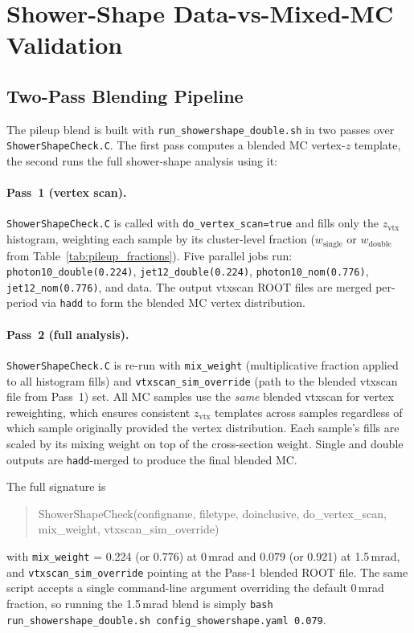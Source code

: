\documentclass[11pt,a4paper]{article}
\newcommand{\zvtx}{\ensuremath{z_{\mathrm{vtx}}}\xspace}
\begin{document}
\section{Shower-Shape Data-vs-Mixed-MC Validation}
\label{sec:shower_shape}

\subsection{Two-Pass Blending Pipeline}
\label{subsec:two_pass}

The pileup blend is built with \texttt{run\_showershape\_double.sh}
in two passes over \texttt{ShowerShapeCheck.C}. The first pass
computes a blended MC vertex-$z$ template, the second runs the full
shower-shape analysis using it:

\paragraph{Pass~1 (vertex scan).}
\texttt{ShowerShapeCheck.C} is called with
\texttt{do\_vertex\_scan=true} and fills only the \zvtx histogram,
weighting each sample by its cluster-level fraction
($w_{\text{single}}$ or $w_{\text{double}}$ from
Table~\ref{tab:pileup_fractions}). Five parallel jobs run:
\texttt{photon10\_double(0.224)}, \texttt{jet12\_double(0.224)},
\texttt{photon10\_nom(0.776)}, \texttt{jet12\_nom(0.776)}, and data.
The output vtxscan ROOT files are merged per-period via \texttt{hadd}
to form the blended MC vertex distribution.

\paragraph{Pass~2 (full analysis).}
\texttt{ShowerShapeCheck.C} is re-run with \texttt{mix\_weight}
(multiplicative fraction applied to all histogram fills) and
\texttt{vtxscan\_sim\_override} (path to the blended vtxscan file
from Pass~1) set. All MC samples use the \emph{same} blended vtxscan
for vertex reweighting, which ensures consistent \zvtx templates
across samples regardless of which sample originally provided the
vertex distribution. Each sample's fills are scaled by its mixing
weight on top of the cross-section weight. Single and double outputs
are \texttt{hadd}-merged to produce the final blended MC.

The full signature is
\begin{quote}\footnotesize\ttfamily
ShowerShapeCheck(configname, filetype, doinclusive, do\_vertex\_scan, mix\_weight, vtxscan\_sim\_override)
\end{quote}
with \texttt{mix\_weight} = 0.224 (or 0.776) at 0\,mrad and 0.079
(or 0.921) at 1.5\,mrad, and \texttt{vtxscan\_sim\_override} pointing
at the Pass-1 blended ROOT file. The same script accepts a single
command-line argument overriding the default 0\,mrad fraction, so
running the 1.5\,mrad blend is simply \texttt{bash
run\_showershape\_double.sh config\_showershape.yaml 0.079}.
\end{document}
